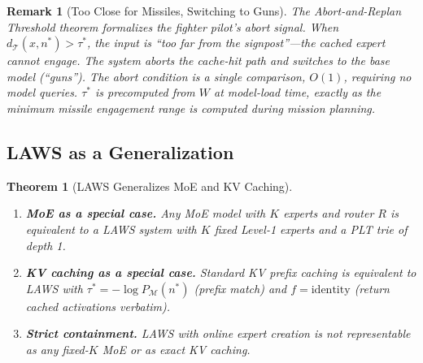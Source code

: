 \documentclass[11pt]{article}
\newtheorem{theorem}{Theorem}
\newtheorem{remark}{Remark}
\begin{document}
\begin{remark}[Too Close for Missiles, Switching to Guns]
The Abort-and-Replan Threshold theorem formalizes the fighter pilot's abort
signal.  When $d_{\mathcal{T}}(x, n^*) > \tau^*$, the input is ``too far from
the signpost''---the cached expert cannot engage.  The system aborts the
cache-hit path and switches to the base model (``guns'').  The abort condition
is a single comparison, $O(1)$, requiring no model queries.  $\tau^*$ is
precomputed from $W$ at model-load time, exactly as the minimum missile
engagement range is computed during mission planning.
\end{remark}

\subsection{LAWS as a Generalization}

\begin{theorem}[LAWS Generalizes MoE and KV Caching]
\label{thm:generalize}
\begin{enumerate}[leftmargin=2em,label=(\alph*)]
  \item \textbf{MoE as a special case.}  Any MoE model with $K$ experts and
        router $R$ is equivalent to a LAWS system with $K$ fixed Level-1 experts
        and a PLT trie of depth 1.

  \item \textbf{KV caching as a special case.}  Standard KV prefix caching is
        equivalent to LAWS with $\tau^* = -\log P_{\mathcal{M}}(n^*)$ (prefix match) and
        $f = \mathrm{identity}$ (return cached activations verbatim).

  \item \textbf{Strict containment.}  LAWS with online expert creation is not
        representable as any fixed-$K$ MoE or as exact KV caching.
\end{enumerate}
\end{theorem}
\end{document}
